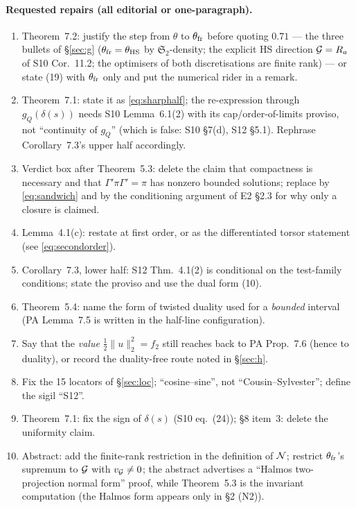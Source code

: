 \documentclass[11pt]{article}
\newcommand{\Stwo}{\mathfrak S_2}\newcommand{\Sone}{\mathfrak S_1}
\newcommand{\norm}[1]{\lVert #1\rVert}\newcommand{\abs}[1]{\lvert #1\rvert}
\begin{document}
\paragraph{Requested repairs (all editorial or one-paragraph).}
\begin{enumerate}[leftmargin=2.0em,itemsep=1pt]
\item[R1] Theorem~7.2: justify the step from $\theta$ to $\theta_{\rm fr}$ before quoting
 $0.71$ --- the three bullets of \S\ref{sec:g} ($\theta_{\rm fr}=\theta_{\rm HS}$ by
 $\Stwo$-density; the explicit HS direction $\mathcal G=R_a$ of S10 Cor.~11.2; the optimisers of
 both discretisations are finite rank) --- or state (19) with $\theta_{\rm fr}$ only and put
 the numerical rider in a remark.
\item[R2] Theorem~7.1: state it as \eqref{eq:sharphalf}; the re-expression through
 $g_Q(\delta(s))$ needs S10 Lemma~6.1(2) with its cap/order-of-limits proviso, not
 ``continuity of $g_Q$'' (which is false: S10 \S7(d), S12 \S5.1).  Rephrase
 Corollary~7.3's upper half accordingly.
\item[R3] Verdict box after Theorem~5.3: delete the claim that compactness is necessary and
 that $\Gamma'\pi\Gamma'=\pi$ has nonzero bounded solutions; replace by \eqref{eq:sandwich}
 and by the conditioning argument of E2 \S2.3 for why only a closure is claimed.
\item[R4] Lemma~4.1(c): restate at first order, or as the differentiated torsor statement
 (see \eqref{eq:secondorder}).
\item[R5] Corollary~7.3, lower half: S12 Thm.~4.1(2) is conditional on the test-family
 conditions; state the proviso and use the dual form (10).
\item[R6] Theorem~5.4: name the form of twisted duality used for a \emph{bounded} interval
 (PA Lemma~7.5 is written in the half-line configuration).
\item[R7] Say that the \emph{value} $\tfrac12\norm u_2^2=f_2$ still reaches back to PA
 Prop.~7.6 (hence to duality), or record the duality-free route noted in \S\ref{sec:h}.
\item[R8] Fix the 15 locators of \S\ref{sec:loc}; ``cosine--sine'', not ``Cousin--Sylvester'';
 define the sigil ``S12''.
\item[R9] Theorem~7.1: fix the sign of $\delta(s)$ (S10 eq.~(24)); \S8 item~3: delete the
 uniformity claim.
\item[R10] Abstract: add the finite-rank restriction in the definition of $\mathcal N$; restrict
 $\theta_{\rm fr}$'s supremum to $\mathcal G$ with $v_\mathcal G\ne0$; the abstract advertises a
 ``Halmos two-projection normal form'' proof, while Theorem~5.3 is the invariant
 computation (the Halmos form appears only in \S2 (N2)).
\end{enumerate}
\end{document}
